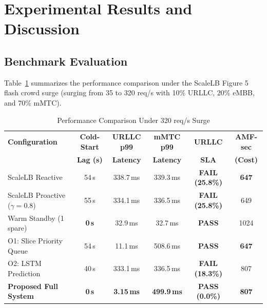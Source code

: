 \documentclass[conference]{IEEEtran}
\begin{document}
\section{Experimental Results and Discussion}

\subsection{Benchmark Evaluation}
Table~\ref{tab:results} summarizes the performance comparison under the ScaleLB Figure 5 flash crowd surge (surging from 35 to 320 req/s with 10\% URLLC, 20\% eMBB, and 70\% mMTC).

\begin{table}[t]
\caption{Performance Comparison Under 320 req/s Surge}
\label{tab:results}
\centering
\begin{tabular}{lccccc}
\toprule
\textbf{Configuration} & \textbf{Cold-Start} & \textbf{URLLC p99} & \textbf{mMTC p99} & \textbf{URLLC} & \textbf{AMF-sec} \\
 & \textbf{Lag (s)} & \textbf{Latency} & \textbf{Latency} & \textbf{SLA} & \textbf{(Cost)} \\
\midrule
ScaleLB Reactive~\cite{scalelb} & 54\,s & 338.7\,ms & 339.3\,ms & \textbf{FAIL (25.8\%)} & \textbf{647} \\
ScaleLB Proactive ($\gamma=0.8$) & 55\,s & 334.1\,ms & 336.5\,ms & \textbf{FAIL (25.8\%)} & 649 \\
Warm Standby (1 spare) & \textbf{0\,s} & 32.9\,ms & 32.7\,ms & \textbf{PASS} & 1024 \\
O1: Slice Priority Queue & 54\,s & 11.1\,ms & 508.6\,ms & \textbf{PASS} & \textbf{647} \\
O2: LSTM Prediction & 40\,s & 333.1\,ms & 336.5\,ms & \textbf{FAIL (18.3\%)} & 807 \\
\textbf{Proposed Full System} & \textbf{0\,s} & \textbf{3.15\,ms} & \textbf{499.9\,ms} & \textbf{PASS (0.0\%)} & \textbf{807} \\
\bottomrule
\end{tabular}
\end{table}
\end{document}
